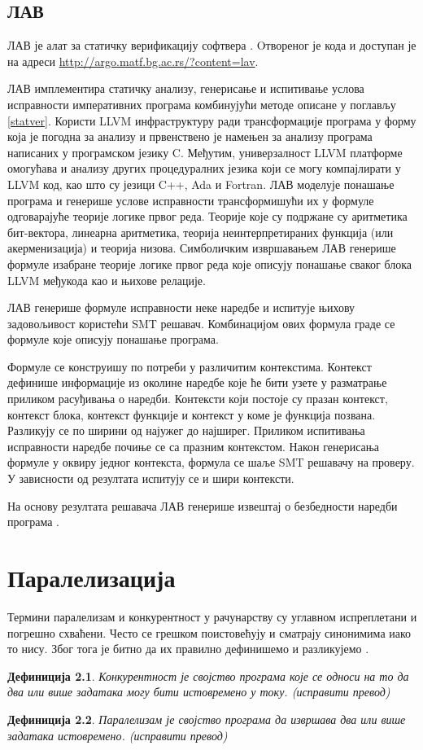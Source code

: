 \documentclass[12pt,oneside]{memoir}
\newtheorem{definic}{Дефиниција}
\begin{document}
  \section{ЛАВ}
	ЛАВ је алат за статичку верификацију софтвера \cite{mvjphd}. Oтвореног је кода и доступан је на адреси \url{http://argo.matf.bg.ac.rs/?content=lav}. 
	
	ЛАВ имплементира статичку анализу, генерисање и испитивање услова исправности императивних програма комбинујући методе описане у поглављу \ref{statver}. Користи LLVM инфраструктуру ради трансформације програма у форму која је погодна за анализу и првенствено је намењен за анализу програма написаних у програмском језику C. Међутим, универзалност LLVM платформе омогућава и анализу других процедуралних језика који се могу компајлирати у LLVM код, као што су језици C++, Ada и Fortran. ЛАВ моделује понашање програма и генерише услове исправности трансформишући их у формуле одговарајуће теорије логике првог реда. Теорије које су подржане су аритметика бит-вектора, линеарна аритметика, теорија неинтерпретираних функција (или акерменизација) и теорија низова.  Симболичким извршавањем ЛАВ генерише формуле изабране теорије логике првог реда које описују понашање сваког блока LLVM међукода као и њихове релације. 
	
	ЛАВ генерише формуле исправности неке наредбе и испитује њихову задовољивост користећи SMT решавач. Комбинацијом ових формула граде се формуле које описују понашање програма. 
	
	 Формуле се конструишу по потреби у различитим контекстима. Контекст дефинише информације из околине наредбе које ће бити узете у разматрање приликом расуђивања о наредби. Контексти који постоје су празан контекст, контекст блока, контекст функције и контекст у коме је функција позвана. Разликују се по ширини од најужег до најширег. Приликом испитивања исправности наредбе почиње се са празним контекстом.  Након генерисања формуле у оквиру једног контекста, формула се шаље SMT решавачу на проверу. У зависности од резултата испитују се и шири контексти. 
	 
 На основу резултата решавача ЛАВ генерише извештај о безбедности наредби програма \cite{mvjdev}. 	
	 
	
\chapter{Паралелизација}
	Термини паралелизам и конкурентност у рачунарству су углавном испреплетани и погрешно схваћени. Често се грешком поистовећују и сматрају синонимима иако то нису. Због тога је битно да их правилно дефинишемо и разликујемо \cite{par_computing}.
\begin{definic}
	Конкурентност је својство програма које се односи на то да два или више задатака могу бити истовремено у току. (исправити превод)
\end{definic}
\begin{definic}
	Паралелизам је својство програма да извршава два или више задатака истовремено. (исправити превод)
\end{definic}
\end{document}
